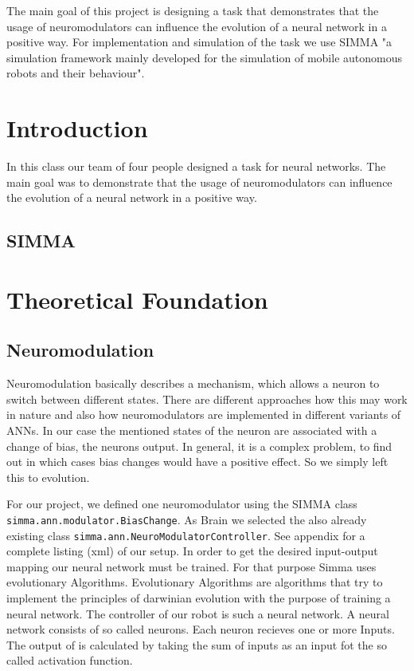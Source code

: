 \documentclass[12pt,fleqn,a4paper]{article}
\begin{document}
\clearpage
\pagestyle{headings}
\setcounter{page}{1}
\setcounter{page}{1}

\tableofcontents
\newpage

\abstract
{The main goal of this project is designing a task that demonstrates that the usage of neuromodulators can influence the evolution of a neural network in a positive way. For implementation and simulation of the task we use SIMMA "a simulation framework mainly developed for the simulation of mobile autonomous robots and their behaviour".}

\section{Introduction}
In this class our team of four people designed a task for neural networks.  The main goal was to demonstrate that the usage of neuromodulators can influence the evolution of a neural network in a positive way.

\subsection{SIMMA}

\section{Theoretical Foundation}
\subsection{Neuromodulation}
Neuromodulation basically describes a mechanism, which allows a neuron to switch between different states. There are different approaches how this may work in nature and also how neuromodulators are implemented in different variants of ANNs. In our case the mentioned states of the neuron are associated with a change of bias, the neurons output. In general, it is a complex problem, to find out in which cases bias changes would have a positive effect. So we simply left this to evolution.

For our project, we defined one neuromodulator using the SIMMA class\\ \texttt{simma.ann.modulator.BiasChange}. As Brain we selected the also already existing class \texttt{simma.ann.NeuroModulatorController}. See appendix for a complete listing (xml) of our setup.
In order to get the desired input-output mapping our neural network must be trained.
For that purpose Simma uses evolutionary Algorithms. Evolutionary Algorithms are algorithms that try to implement the principles of darwinian evolution with the purpose of training a neural network. The controller of our robot is such a neural network.
A neural network consists of so called neurons. Each neuron recieves one or more Inputs. The output of is calculated by taking the sum of inputs as an input fot the so called activation function.
\end{document}
